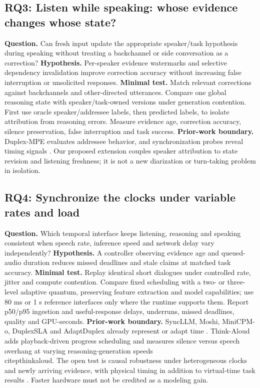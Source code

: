\documentclass{article}
\newcommand{\researchquestion}[2]{\subsection{#1: #2}}
\begin{document}
\researchquestion{RQ3}{Listen while speaking: whose evidence changes whose state?}
\textbf{Question.} Can fresh input update the appropriate speaker/task hypothesis during speaking without treating a backchannel or side conversation as a correction? \textbf{Hypothesis.} Per-speaker evidence watermarks and selective dependency invalidation improve correction accuracy without increasing false interruption or unsolicited responses. \textbf{Minimal test.} Match relevant corrections against backchannels and other-directed utterances. Compare one global reasoning state with speaker/task-owned versions under generation contention. First use oracle speaker/addressee labels, then predicted labels, to isolate attribution from reasoning errors. Measure evidence age, correction accuracy, silence preservation, false interruption and task success. \textbf{Prior-work boundary.} Duplex-MPE evaluates addressee behavior, and synchronization probes reveal timing signals \citep{mpe,synchrony}. Our proposed extension couples speaker attribution to state revision and listening freshness; it is not a new diarization or turn-taking problem in isolation.

\researchquestion{RQ4}{Synchronize the clocks under variable rates and load}
\textbf{Question.} Which temporal interface keeps listening, reasoning and speaking consistent when speech rate, inference speed and network delay vary independently? \textbf{Hypothesis.} A controller observing evidence age and queued-audio duration reduces missed deadlines and stale claims at matched task accuracy. \textbf{Minimal test.} Replay identical short dialogues under controlled rate, jitter and compute contention. Compare fixed scheduling with a two- or three-level adaptive quantum, preserving feature extraction and model capabilities; use 80 ms or 1 s reference interfaces only where the runtime supports them. Report p50/p95 ingestion and useful-response delays, underruns, missed deadlines, quality and GPU-seconds. \textbf{Prior-work boundary.} SyncLLM, Moshi, MiniCPM-o, DuplexSLA and AdaptDuplex already represent or adapt time \citep{syncllm,moshi,minicpm,duplexsla,adapt}. Think-Aloud adds playback-driven progress scheduling and measures silence versus speech overhang at varying reasoning-generation speeds \\citep{thinkaloud}. The open test is causal robustness under heterogeneous clocks and newly arriving evidence, with physical timing in addition to virtual-time task results \citep{tauvoice}. Faster hardware must not be credited as a modeling gain.
\end{document}
